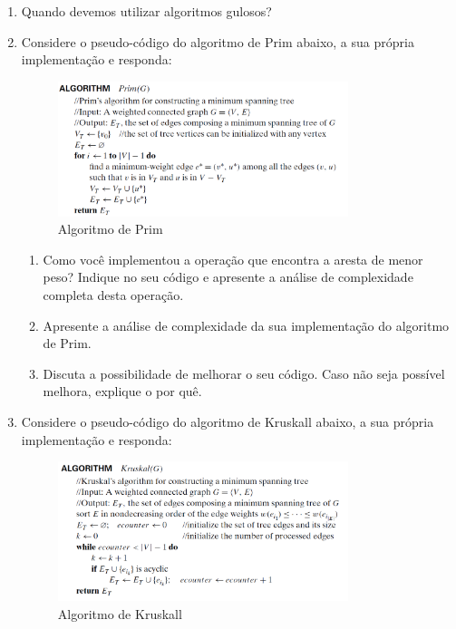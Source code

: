 \documentclass{article}
\begin{document}
\begin{enumerate}
    \item Quando devemos utilizar algoritmos gulosos?

    \item Considere o pseudo-código do algoritmo de Prim abaixo, a sua própria implementação e responda:
    
    \begin{figure}[!ht]
        \centering
        \includegraphics*[width=0.8\textwidth]{prim.png}
        \caption{Algoritmo de Prim}
    \end{figure}

    \begin{enumerate}
        \item Como você implementou a operação que encontra a aresta de menor peso? Indique no seu código e apresente a análise de complexidade completa desta operação.
        \item Apresente a análise de complexidade da sua implementação do algoritmo de Prim.
        \item Discuta a possibilidade de melhorar o seu código. Caso não seja possível melhora, explique o por quê. 
    \end{enumerate}

    \pagebreak

    \item Considere o pseudo-código do algoritmo de Kruskall abaixo, a sua própria implementação e responda:
    
    \begin{figure}[!ht]
        \centering
        \includegraphics*[width=0.8\textwidth]{kruskall.png}
        \caption{Algoritmo de Kruskall}
    \end{figure}


\end{enumerate}
\end{document}

